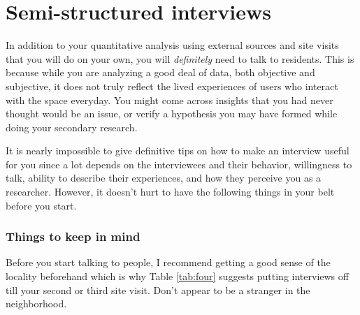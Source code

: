 \documentclass[
]{latex/krantz}
\begin{document}
\hypertarget{interviews}{%
\section{Semi-structured interviews}\label{interviews}}

In addition to your quantitative analysis using external sources and site visits that you will do on your own, you will \emph{definitely} need to talk to residents. This is because while you are analyzing a good deal of data, both objective and subjective, it does not truly reflect the lived experiences of users who interact with the space everyday. You might come across insights that you had never thought would be an issue, or verify a hypothesis you may have formed while doing your secondary research.

It is nearly impossible to give definitive tips on how to make an interview useful for you since a lot depends on the interviewees and their behavior, willingness to talk, ability to describe their experiences, and how they perceive you as a researcher. However, it doesn't hurt to have the following things in your belt before you start.

\hypertarget{kim}{%
\subsubsection{Things to keep in mind}\label{kim}}

Before you start talking to people, I recommend getting a good sense of the locality beforehand which is why Table \ref{tab:four} suggests putting interviews off till your second or third site visit. Don't appear to be a stranger in the neighborhood.
\end{document}
